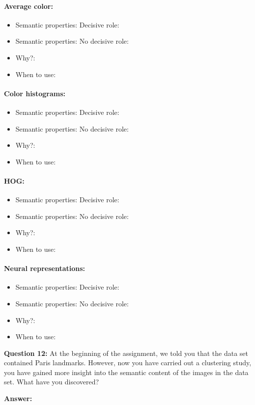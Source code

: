 \documentclass[11pt]{article}
\begin{document}
\paragraph{Average color:}
\begin{itemize}
\item Semantic properties: Decisive role:

\item Semantic properties: No decisive role:

\item Why?:

\item When to use:
\end{itemize}

\paragraph{Color histograms:}
\begin{itemize}
\item Semantic properties: Decisive role:

\item Semantic properties: No decisive role:

\item Why?:

\item When to use:
\end{itemize}

\paragraph{HOG:}
\begin{itemize}
\item Semantic properties: Decisive role:

\item Semantic properties: No decisive role:

\item Why?:

\item When to use:
\end{itemize}

\paragraph{Neural representations:}
\begin{itemize}
\item Semantic properties: Decisive role:

\item Semantic properties: No decisive role:

\item Why?:

\item When to use:
\end{itemize}


\noindent\textbf{Question 12:} At the beginning of the assignment, we told you that the data set contained Paris landmarks. However, now you have carried out a clustering study, you have gained more insight into the semantic content of the images in the data set. What have you discovered?

\textbf{Answer:}
\end{document}
